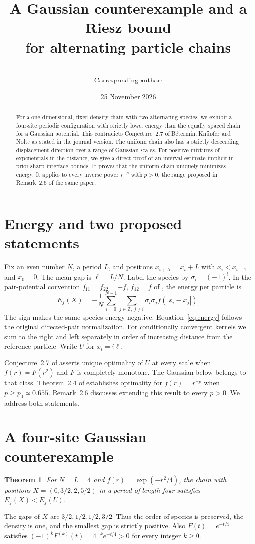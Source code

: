 \documentclass[11pt]{article}
\title{A Gaussian counterexample and a Riesz bound\\for alternating particle chains}
\author{\ResearchAuthor\\[2pt]
  \small Corresponding author: {\creditfont\CorrespondingAuthor}}
\date{25 November 2026}
\newtheorem{theorem}{Theorem}
\newcommand{\Z}{\mathbb Z}
\begin{document}
\maketitle
\begin{abstract}
For a one-dimensional, fixed-density chain with two alternating species, we exhibit a four-site periodic configuration with strictly lower energy than the equally spaced chain for a Gaussian potential. This contradicts Conjecture~2.7 of B\'etermin, Kn\"upfer and Nolte as stated in the journal version. The uniform chain also has a strictly descending displacement direction over a range of Gaussian scales. For positive mixtures of exponentials in the distance, we give a direct proof of an interval estimate implicit in prior sharp-interface bounds. It proves that the uniform chain uniquely minimizes energy. It applies to every inverse power $r^{-p}$ with $p>0$, the range proposed in Remark~2.6 of the same paper.
\end{abstract}

\section{Energy and two proposed statements}
Fix an even number $N$, a period $L$, and positions $x_{i+N}=x_i+L$ with $x_i<x_{i+1}$ and $x_0=0$. The mean gap is $\ell=L/N$. Label the species by $\sigma_i=(-1)^i$. In the pair-potential convention $f_{11}=f_{22}=-f$, $f_{12}=f$ of \cite{BKN}, the energy per particle is
\begin{equation}\label{eq:energy}
 E_f(X)=-\frac1N\sum_{i=0}^{N-1}\sum_{j\in\Z,\ j\ne i}
                 \sigma_i\sigma_j f(|x_i-x_j|).
\end{equation}
The sign makes the same-species energy negative. Equation~\eqref{eq:energy} follows the original directed-pair normalization. For conditionally convergent kernels we sum to the right and left separately in order of increasing distance from the reference particle. Write $U$ for $x_i=i\ell$.

Conjecture~2.7 of \cite{BKN} asserts unique optimality of $U$ at every scale when $f(r)=F(r^2)$ and $F$ is completely monotone. The Gaussian below belongs to that class. Theorem~2.4 of \cite{BKN} establishes optimality for $f(r)=r^{-p}$ when $p\ge p_0\simeq0.655$. Remark~2.6 discusses extending this result to every $p>0$. We address both statements.

\section{A four-site Gaussian counterexample}
\begin{theorem}\label{thm:gauss}
For $N=L=4$ and $f(r)=\exp(-r^2/4)$, the chain with positions $X=(0,3/2,2,5/2)$ in a period of length four satisfies $E_f(X)<E_f(U)$.
\end{theorem}
The gaps of $X$ are $3/2,1/2,1/2,3/2$. Thus the order of species is preserved, the density is one, and the smallest gap is strictly positive. Also $F(t)=e^{-t/4}$ satisfies $(-1)^kF^{(k)}(t)=4^{-k}e^{-t/4}>0$ for every integer $k\ge0$.
\end{document}
